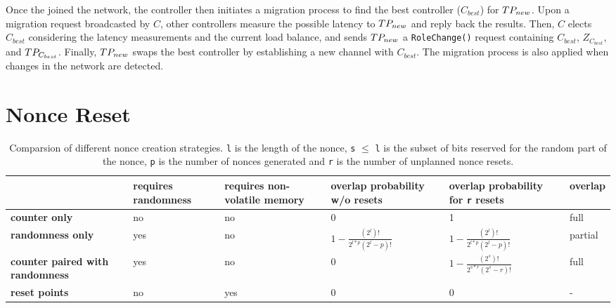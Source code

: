 Once the \tp joined the network, the controller then initiates a migration process to
find the best controller ($C_{best}$) for $TP_{new}$. Upon a migration request broadcasted
by $C$, other controllers measure the possible latency to $TP_{new}$ and reply back
the results. Then, $C$ elects $C_{best}$ considering the latency measurements and the
current load balance, and sends $TP_{new}$ a \texttt{RoleChange()} request containing
$C_{best}$, $Z_{C_{best}}$, and $TP_{C_{best}}$. Finally, $TP_{new}$ swaps the best
controller by establishing a new channel with $C_{best}$. The migration process
is also applied when changes in the network are detected.


\section{Nonce Reset}
\label{sec:nonce}

\begin{table}[htb]
	\footnotesize
	\caption{Comparsion of different nonce creation strategies. \texttt{l} is the length of the
		nonce, \texttt{s} $\leq$ \texttt{l} is the subset of bits reserved for the random part of the nonce,
		\texttt{p} is the number of nonces generated and \texttt{r} is the number of unplanned nonce
	resets.}
	\label{tab:nonce}
	\renewcommand\arraystretch{2}
	\begin{tabularx}{1.1\linewidth}{|X|X|X|X|X|X|}
		\hline
		& \textbf{requires randomness}                       & \textbf{requires non-volatile memory} & \textbf{overlap probability w/o
		resets}                                 & \textbf{overlap probability for \texttt{r} resets} & \textbf{overlap}                                                                                                    \\
		\hline
		\textbf{counter only} & no & no  & 0 & 1 & full \\
		\hline
		\textbf{randomness only}                & yes                                                & no                                    &
		$1-\frac{(2^l)!}{2^{l*p}(2^l-p)!}$
		& $1-\frac{(2^l)!}{2^{l*p}(2^l-p)!}$                 & partial                                                                                                             \\
		\hline
		\textbf{counter paired with randomness} & yes                                                & no                                    & 0                               & $1-\frac{(2^s)!}{2^{s*r}(2^s-r)!}$
		& full                                                                                                                                                                     \\
		\hline
		\textbf{reset points} & no & yes & 0 & 0 & -    \\
		\hline
	\end{tabularx}%
\end{table}

